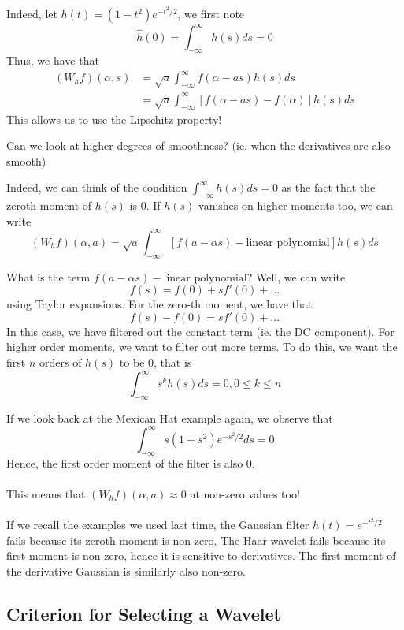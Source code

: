 \documentclass{article}
\begin{document}
Indeed, let $h(t) = (1 - t^2) e^{-t^2/2}$, we first note 
\[\widehat{h}(0) = \int_{-\infty}^\infty h(s) ds = 0\]
Thus, we have that
\begin{align*}
    (W_h f)(\alpha, s) &= \sqrt{a} \int_{-\infty}^\infty f(\alpha - as) h(s) ds\\
    &= \sqrt{a} \int_{-\infty}^\infty [f(\alpha - as) - f(\alpha)] h(s) ds
\end{align*}
This allows us to use the Lipschitz property!

\begin{question}
    Can we look at higher degrees of smoothness? (ie. when the derivatives are also smooth)
\end{question}

Indeed, we can think of the condition $\int_{-\infty}^\infty h(s) ds = 0$ as the fact that the zeroth moment of $h(s)$ is $0$. If $h(s)$ vanishes on higher moments too, we can write
\[(W_h f)(\alpha, a) = \sqrt{a} \int_{-\infty}^\infty [f(a - \alpha s) - \text{linear polynomial}] h(s) ds\]

What is the term $f(a - \alpha s) - \text{linear polynomial}$? Well, we can write 
\[f(s) = f(0) + s f'(0) + ...\]
using Taylor expansions. For the zero-th moment, we have that
\[f(s) - f(0) = s f'(0) + ... \]
In this case, we have filtered out the constant term (ie. the DC component). For higher order moments, we want to filter out more terms. To do this, we want the first $n$ orders of $h(s)$ to be $0$, that is
\[\int_{-\infty}^\infty s^k h(s) ds = 0, 0 \leq k \leq n\]

\begin{example}
    If we look back at the Mexican Hat example again, we observe that
    \[\int_{-\infty}^\infty s (1 - s^2) e^{-s^2/2} ds = 0\]
    Hence, the first order moment of the filter is also $0$.\\\\
    This means that $(W_h f)(\alpha, a) \approx 0$ at non-zero values too!\\\\
    If we recall the examples we used last time, the Gaussian filter $h(t) = e^{-t^2/2}$ fails because its zeroth moment is non-zero. The Haar wavelet fails because its first moment is non-zero, hence it is sensitive to derivatives. The first moment of the derivative Gaussian is similarly also non-zero.
\end{example}

\subsection{Criterion for Selecting a Wavelet}
\end{document}
